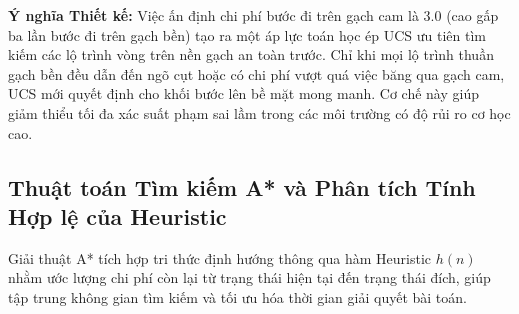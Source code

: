 \noindent
\textbf{Ý nghĩa Thiết kế:}
Việc ấn định chi phí bước đi trên gạch cam là $3.0$ (cao gấp ba lần bước đi
trên gạch bền) tạo ra một áp lực toán học ép UCS ưu tiên tìm kiếm các lộ trình
vòng trên nền gạch an toàn trước. Chỉ khi mọi lộ trình thuần gạch bền đều dẫn
đến ngõ cụt hoặc có chi phí vượt quá việc băng qua gạch cam, UCS mới quyết định
cho khối bước lên bề mặt mong manh. Cơ chế này giúp giảm thiểu tối đa xác suất
phạm sai lầm trong các môi trường có độ rủi ro cơ học cao.

\subsection{Thuật toán Tìm kiếm A* và Phân tích Tính Hợp lệ của Heuristic}
\label{subsec:astar_admissibility}
Giải thuật A* tích hợp tri thức định hướng thông qua hàm Heuristic $h(n)$
nhằm ước lượng chi phí còn lại từ trạng thái hiện tại đến trạng thái đích,
giúp tập trung không gian tìm kiếm và tối ưu hóa thời gian giải quyết bài toán.

